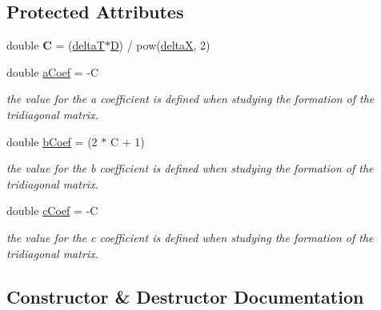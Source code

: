 \subsection*{Protected Attributes}
\begin{DoxyCompactItemize}
\item 
\mbox{\label{class_laasonen_method_a9261b579f612bf4ce6b0d85cbe39bb56}} 
double {\bfseries C} = (\hyperlink{class_solution_a116a08a1a8793618fb5269016cfd9b61}{deltaT}$\ast$\hyperlink{class_solution_af647b9b893549259060034672babb0f8}{D}) / pow(\hyperlink{class_solution_a8e97e5534ddcde31983432b8fb2050ff}{deltaX}, 2)
\item 
\mbox{\label{class_laasonen_method_aee3ebb954e012f6ba5ba4f408a153cd6}} 
double \hyperlink{class_laasonen_method_aee3ebb954e012f6ba5ba4f408a153cd6}{a\+Coef} = -\/C
\begin{DoxyCompactList}\small\item\em the value for the a coefficient is defined when studying the formation of the tridiagonal matrix. \end{DoxyCompactList}\item 
\mbox{\label{class_laasonen_method_aac020d80815f449386c66a16c9c1d4cb}} 
double \hyperlink{class_laasonen_method_aac020d80815f449386c66a16c9c1d4cb}{b\+Coef} = (2 $\ast$ C + 1)
\begin{DoxyCompactList}\small\item\em the value for the b coefficient is defined when studying the formation of the tridiagonal matrix. \end{DoxyCompactList}\item 
\mbox{\label{class_laasonen_method_a20f8fcb3ad8f0befd3abcacc567d28ab}} 
double \hyperlink{class_laasonen_method_a20f8fcb3ad8f0befd3abcacc567d28ab}{c\+Coef} = -\/C
\begin{DoxyCompactList}\small\item\em the value for the c coefficient is defined when studying the formation of the tridiagonal matrix. \end{DoxyCompactList}\end{DoxyCompactItemize}


\subsection{Constructor \& Destructor Documentation}
\mbox{\label{class_laasonen_method_a1bff2dc73fc66c3070fc7a187ff556f9}} 

